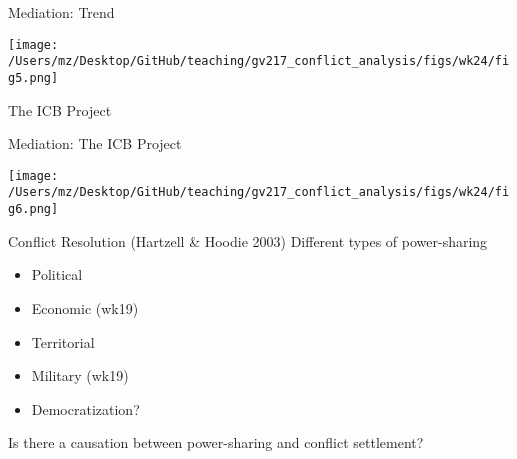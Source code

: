 \documentclass[handout]{beamer}
\begin{document}
\begin{frame}{Mediation: Trend}
    \pause
    \begin{center}
        \texttt{[image: /Users/mz/Desktop/GitHub/teaching/gv217\_conflict\_analysis/figs/wk24/fig5.png]}
    \end{center}
    \tiny The ICB Project
\end{frame}

\begin{frame}{Mediation: The ICB Project}
    \pause
    \begin{center}
        \texttt{[image: /Users/mz/Desktop/GitHub/teaching/gv217\_conflict\_analysis/figs/wk24/fig6.png]}
    \end{center}
\end{frame}

\begin{frame}{Conflict Resolution (Hartzell \& Hoodie 2003)}
    Different types of power-sharing
    \begin{itemize}
        \pause\item Political
        \pause\item Economic (wk19)
        \pause\item Territorial
        \pause\item Military (wk19)
        \pause\item Democratization?
    \end{itemize}
    Is there a causation between power-sharing and conflict settlement?
\end{frame}
\end{document}
